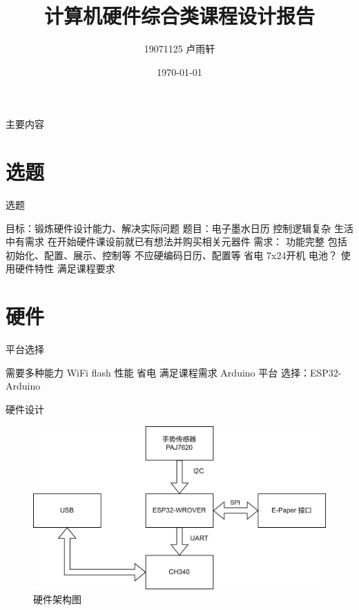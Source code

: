 \documentclass{ctexbeamer}
\title{计算机硬件综合类课程设计报告}
\author{19071125 卢雨轩}
\date{\today}
\begin{document}
\maketitle

\begin{frame}{主要内容}
    \tableofcontents
\end{frame}

\section{选题}

\begin{frame}{选题}
    \begin{outline}
        \1 目标：锻炼硬件设计能力、解决实际问题
        \1 题目：电子墨水日历
            \2 控制逻辑复杂
            \2 生活中有需求
                \3 在开始硬件课设前就已有想法并购买相关元器件
        \1 需求：
            \2 功能完整
                \3 包括初始化、配置、展示、控制等
                \3 不应硬编码日历、配置等
            \2 省电
                \3 7x24开机
                \3 电池？
            \2 使用硬件特性
                \3 满足课程要求
    \end{outline}
\end{frame}

\section{硬件}

\begin{frame}{平台选择}
    \begin{outline}
        \1 需要多种能力
            \2 WiFi
            \2 flash
            \2 性能
            \2 省电
        \1 满足课程需求
            \2 Arduino 平台
        \1 选择：ESP32-Arduino
    \end{outline}
\end{frame}

\begin{frame}{硬件设计}
    \begin{figure}[htp]
        \centering
        \includegraphics[width=.8\linewidth]{架构.drawio.png}
        \caption{硬件架构图}
    \end{figure}
\end{frame}
\end{document}
